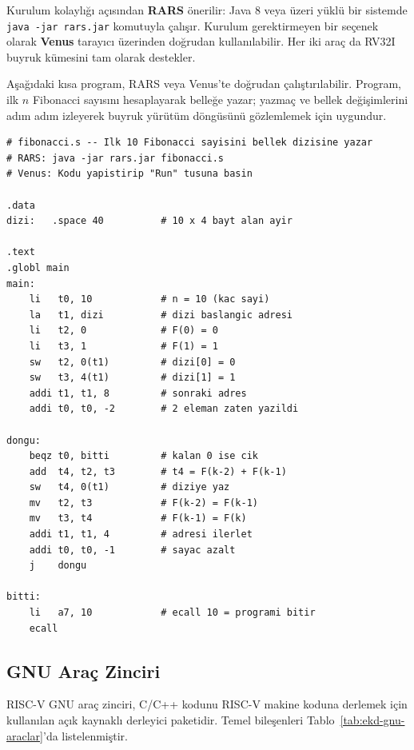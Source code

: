 \begin{bilginot}
Kurulum kolaylığı açısından \textbf{RARS} önerilir: Java 8 veya üzeri yüklü bir sistemde \texttt{java -jar rars.jar} komutuyla çalışır. Kurulum gerektirmeyen bir seçenek olarak \textbf{Venus} tarayıcı üzerinden doğrudan kullanılabilir. Her iki araç da RV32I buyruk kümesini tam olarak destekler.
\end{bilginot}

Aşağıdaki kısa program, RARS veya Venus'te doğrudan çalıştırılabilir. Program, ilk $n$ Fibonacci sayısını hesaplayarak belleğe yazar; yazmaç ve bellek değişimlerini adım adım izleyerek buyruk yürütüm döngüsünü gözlemlemek için uygundur.

\begin{lstlisting}[style=riscv, caption={Fibonacci sayıları (RARS/Venus ile çalıştırılabilir)}, label={lst:ekd-fibonacci}]
# fibonacci.s -- Ilk 10 Fibonacci sayisini bellek dizisine yazar
# RARS: java -jar rars.jar fibonacci.s
# Venus: Kodu yapistirip "Run" tusuna basin

.data
dizi:   .space 40          # 10 x 4 bayt alan ayir

.text
.globl main
main:
    li   t0, 10            # n = 10 (kac sayi)
    la   t1, dizi          # dizi baslangic adresi
    li   t2, 0             # F(0) = 0
    li   t3, 1             # F(1) = 1
    sw   t2, 0(t1)         # dizi[0] = 0
    sw   t3, 4(t1)         # dizi[1] = 1
    addi t1, t1, 8         # sonraki adres
    addi t0, t0, -2        # 2 eleman zaten yazildi

dongu:
    beqz t0, bitti         # kalan 0 ise cik
    add  t4, t2, t3        # t4 = F(k-2) + F(k-1)
    sw   t4, 0(t1)         # diziye yaz
    mv   t2, t3            # F(k-2) = F(k-1)
    mv   t3, t4            # F(k-1) = F(k)
    addi t1, t1, 4         # adresi ilerlet
    addi t0, t0, -1        # sayac azalt
    j    dongu

bitti:
    li   a7, 10            # ecall 10 = programi bitir
    ecall
\end{lstlisting}

\subsection{GNU Araç Zinciri}
\label{sec:ekd-gnu-arac}

RISC-V GNU araç zinciri, C/C++ kodunu RISC-V makine koduna derlemek için kullanılan açık kaynaklı derleyici paketidir. Temel bileşenleri Tablo~\ref{tab:ekd-gnu-araclar}'da listelenmiştir.

